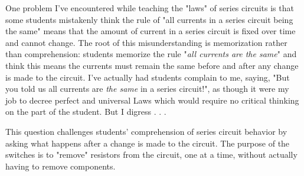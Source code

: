 One problem I've encountered while teaching the "laws" of series circuits is that some students mistakenly think the rule of "all currents in a series circuit being the same" means that the amount of current in a series circuit is fixed over time and cannot change.  The root of this misunderstanding is memorization rather than comprehension: students memorize the rule "{\it all currents are the same}" and think this means the currents must remain the same before and after any change is made to the circuit.  I've actually had students complain to me, saying, "But you told us all currents are {\it the same} in a series circuit!", as though it were my job to decree perfect and universal Laws which would require no critical thinking on the part of the student.  But I digress . . .

This question challenges students' comprehension of series circuit behavior by asking what happens after a change is made to the circuit.  The purpose of the switches is to "remove" resistors from the circuit, one at a time, without actually having to remove components.




